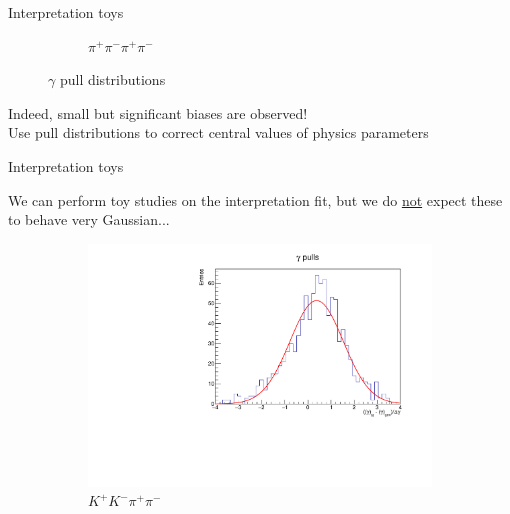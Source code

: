 \documentclass[xcolor={dvipsnames}]{beamer}
\begin{document}
\begin{frame}{Interpretation toys}
\begin{figure}
\begin{subfigure}{0.5\textwidth}
      \vspace{-0.3cm}
      \caption*{$\pi^+\pi^-\pi^+\pi^-$}
    \end{subfigure}
    \vspace{-0.5cm}
    \caption*{$\gamma$ pull distributions}
  \end{figure}
  \vspace{-0.3cm}
  \begin{center}
    Indeed, small but significant biases are observed!\\
    Use pull distributions to correct central values of physics parameters
  \end{center}
\end{frame}

\begin{frame}{Interpretation toys}
  \begin{center}
    We can perform toy studies on the interpretation fit, but we do \underline{not} expect these to behave very Gaussian...
  \end{center}
  \begin{figure}
    \centering
    \begin{subfigure}{0.5\textwidth}
      \centering
      \includegraphics[width=1.0\textwidth]{Plots/gamma_pull_toys_KKpipi.pdf}
      \vspace{-0.3cm}
      \caption*{$K^+K^-\pi^+\pi^-$}
    \end{subfigure}%
    \begin{subfigure}{0.5\textwidth}
      \centering

\end{subfigure}
\end{figure}
\end{frame}
\end{document}
